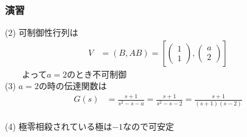 \begin{frame}[t]
\frametitle{演習}
(2) 可制御性行列は
\begin{align*}
	V&= (B,AB) 
	=
	\left[
		\left(\begin{array}{c}
		     1 \\
		     1 
		\end{array}\right)
	,
		\left(\begin{array}{c}
		     a \\
		     2 
		\end{array}\right)
	\right]
\end{align*}
　　よって$a=2$のとき不可制御
\\[3mm]

(3) $a=2$の時の伝達関数は
\begin{align*}
	G(s)&= \frac{s+1}{s^2-s-a}
	= \frac{s+1}{s^2-s-2}
	= \frac{s+1}{(s+1)(s-2)}
\end{align*}
\ \\

(4) 極零相殺されている極は$-1$なので可安定

\end{frame}

